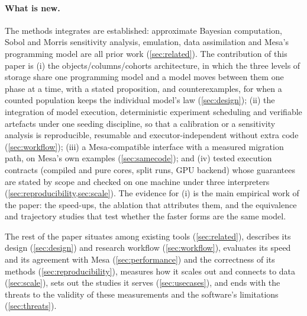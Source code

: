 \paragraph{What is new.} The methods \modelly{} integrates are established: approximate
Bayesian computation, Sobol and Morris sensitivity analysis, emulation, data assimilation
and Mesa's programming model are all prior work (\cref{sec:related}). The contribution of
this paper is (i) the objects/columns/cohorts architecture, in which the three levels of
storage share one programming model and a model moves between them one phase at a time,
with a stated proposition, and counterexamples, for when a counted population keeps the
individual model's law (\cref{sec:design}); (ii) the integration of model execution,
deterministic experiment scheduling and verifiable artefacts under one seeding discipline,
so that a calibration or a sensitivity analysis is reproducible, resumable and
executor-independent without extra code (\cref{sec:workflow}); (iii) a Mesa-compatible
interface with a measured migration path, on Mesa's own examples (\cref{sec:samecode});
and (iv) tested execution contracts (compiled and pure cores, split runs, GPU backend) whose
guarantees are stated by scope and checked on one machine under three interpreters
(\cref{sec:reproducibility,sec:scale}). The evidence for (i) is the main empirical work of
the paper: the speed-ups, the ablation that attributes them, and the equivalence and
trajectory studies that test whether the faster forms are the same model.

The rest of the paper situates \modelly{} among existing tools (\cref{sec:related}),
describes its design (\cref{sec:design}) and research workflow (\cref{sec:workflow}),
evaluates its speed and its agreement with Mesa (\cref{sec:performance}) and the correctness
of its methods (\cref{sec:reproducibility}), measures how it scales out and connects to data
(\cref{sec:scale}), sets out the studies it serves (\cref{sec:usecases}), and ends with the threats to the validity of these measurements and the
software's limitations (\cref{sec:threats}).
